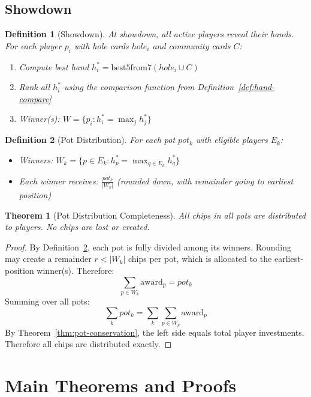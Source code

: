 \documentclass[11pt,a4paper]{article}
\newtheorem{definition}{Definition}[section]
\newtheorem{theorem}{Theorem}[section]
\begin{document}
\subsection{Showdown}

\begin{definition}[Showdown]
\label{def:showdown}
At showdown, all active players reveal their hands. For each player $p_i$ with hole cards $hole_i$ and community cards $C$:
\begin{enumerate}
    \item Compute best hand $h_i^* = \text{best5from7}(hole_i \cup C)$
    \item Rank all $h_i^*$ using the comparison function from Definition~\ref{def:hand-compare}
    \item Winner(s): $W = \{p_i : h_i^* = \max_j h_j^*\}$
\end{enumerate}
\end{definition}

\begin{definition}[Pot Distribution]
\label{def:pot-distribution}
For each pot $pot_k$ with eligible players $E_k$:
\begin{itemize}
    \item Winners: $W_k = \{p \in E_k : h_p^* = \max_{q \in E_k} h_q^*\}$
    \item Each winner receives: $\frac{pot_k}{|W_k|}$ (rounded down, with remainder going to earliest position)
\end{itemize}
\end{definition}

\begin{theorem}[Pot Distribution Completeness]
\label{thm:pot-distribution}
All chips in all pots are distributed to players. No chips are lost or created.
\end{theorem}

\begin{proof}
By Definition~\ref{def:pot-distribution}, each pot is fully divided among its winners. Rounding may create a remainder $r < |W_k|$ chips per pot, which is allocated to the earliest-position winner(s). Therefore:
\[
\sum_{p \in W_k} \text{award}_p = pot_k
\]
Summing over all pots:
\[
\sum_{k} pot_k = \sum_{k} \sum_{p \in W_k} \text{award}_p
\]
By Theorem~\ref{thm:pot-conservation}, the left side equals total player investments. Therefore all chips are distributed exactly.
\end{proof}

\section{Main Theorems and Proofs}
\label{sec:theorems}
\end{document}
